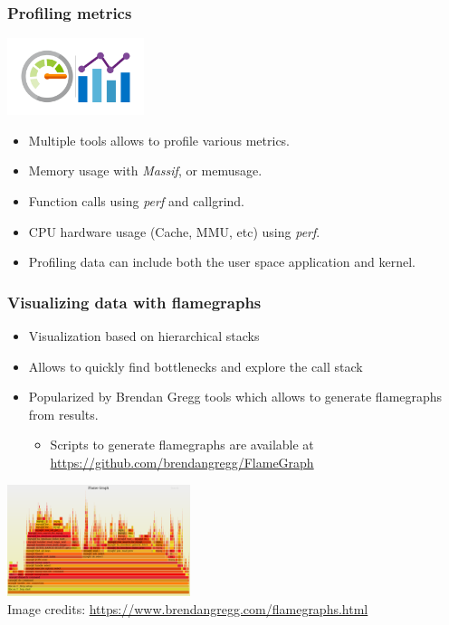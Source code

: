 \begin{frame}
  \frametitle{Profiling metrics}
  \center \includegraphics[width=0.3\textwidth]{../slides/debugging-application-profiling/metrics.png}
  \begin{itemize}
    \item Multiple tools allows to profile various metrics.
    \item Memory usage with {\em Massif},  or memusage.
    \item Function calls using {\em perf} and callgrind.
    \item CPU hardware usage (Cache, MMU, etc) using {\em perf}.
    \item Profiling data can include both the user space application and kernel.
  \end{itemize}
\end{frame}

\begin{frame}
  \frametitle{Visualizing data with flamegraphs}
  \begin{itemize}
    \item Visualization based on hierarchical stacks
    \item Allows to quickly find bottlenecks and explore the call stack
    \item Popularized by Brendan Gregg tools which allows to generate
          flamegraphs from  results.
    \begin{itemize}
      \item Scripts to generate flamegraphs are available at
            \url{https://github.com/brendangregg/FlameGraph}
    \end{itemize} 
  \end{itemize}
  \center \includegraphics[width=0.4\textwidth]{../slides/debugging-application-profiling/flamegraph.png}\\
  \tiny Image credits: \url{https://www.brendangregg.com/flamegraphs.html}
\end{frame}

